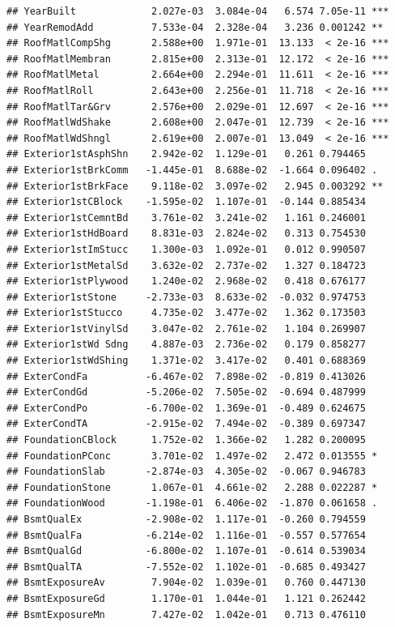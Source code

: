 \documentclass[american,]{article}
\theoremstyle{definition}
\theoremstyle{definition}
\theoremstyle{definition}
\theoremstyle{remark}
\begin{document}
\begin{verbatim}
## YearBuilt             2.027e-03  3.084e-04   6.574 7.05e-11 ***
## YearRemodAdd          7.533e-04  2.328e-04   3.236 0.001242 ** 
## RoofMatlCompShg       2.588e+00  1.971e-01  13.133  < 2e-16 ***
## RoofMatlMembran       2.815e+00  2.313e-01  12.172  < 2e-16 ***
## RoofMatlMetal         2.664e+00  2.294e-01  11.611  < 2e-16 ***
## RoofMatlRoll          2.643e+00  2.256e-01  11.718  < 2e-16 ***
## RoofMatlTar&Grv       2.576e+00  2.029e-01  12.697  < 2e-16 ***
## RoofMatlWdShake       2.608e+00  2.047e-01  12.739  < 2e-16 ***
## RoofMatlWdShngl       2.619e+00  2.007e-01  13.049  < 2e-16 ***
## Exterior1stAsphShn    2.942e-02  1.129e-01   0.261 0.794465    
## Exterior1stBrkComm   -1.445e-01  8.688e-02  -1.664 0.096402 .  
## Exterior1stBrkFace    9.118e-02  3.097e-02   2.945 0.003292 ** 
## Exterior1stCBlock    -1.595e-02  1.107e-01  -0.144 0.885434    
## Exterior1stCemntBd    3.761e-02  3.241e-02   1.161 0.246001    
## Exterior1stHdBoard    8.831e-03  2.824e-02   0.313 0.754530    
## Exterior1stImStucc    1.300e-03  1.092e-01   0.012 0.990507    
## Exterior1stMetalSd    3.632e-02  2.737e-02   1.327 0.184723    
## Exterior1stPlywood    1.240e-02  2.968e-02   0.418 0.676177    
## Exterior1stStone     -2.733e-03  8.633e-02  -0.032 0.974753    
## Exterior1stStucco     4.735e-02  3.477e-02   1.362 0.173503    
## Exterior1stVinylSd    3.047e-02  2.761e-02   1.104 0.269907    
## Exterior1stWd Sdng    4.887e-03  2.736e-02   0.179 0.858277    
## Exterior1stWdShing    1.371e-02  3.417e-02   0.401 0.688369    
## ExterCondFa          -6.467e-02  7.898e-02  -0.819 0.413026    
## ExterCondGd          -5.206e-02  7.505e-02  -0.694 0.487999    
## ExterCondPo          -6.700e-02  1.369e-01  -0.489 0.624675    
## ExterCondTA          -2.915e-02  7.494e-02  -0.389 0.697347    
## FoundationCBlock      1.752e-02  1.366e-02   1.282 0.200095    
## FoundationPConc       3.701e-02  1.497e-02   2.472 0.013555 *  
## FoundationSlab       -2.874e-03  4.305e-02  -0.067 0.946783    
## FoundationStone       1.067e-01  4.661e-02   2.288 0.022287 *  
## FoundationWood       -1.198e-01  6.406e-02  -1.870 0.061658 .  
## BsmtQualEx           -2.908e-02  1.117e-01  -0.260 0.794559    
## BsmtQualFa           -6.214e-02  1.116e-01  -0.557 0.577654    
## BsmtQualGd           -6.800e-02  1.107e-01  -0.614 0.539034    
## BsmtQualTA           -7.552e-02  1.102e-01  -0.685 0.493427    
## BsmtExposureAv        7.904e-02  1.039e-01   0.760 0.447130    
## BsmtExposureGd        1.170e-01  1.044e-01   1.121 0.262442    
## BsmtExposureMn        7.427e-02  1.042e-01   0.713 0.476110    

\end{verbatim}
\end{document}
